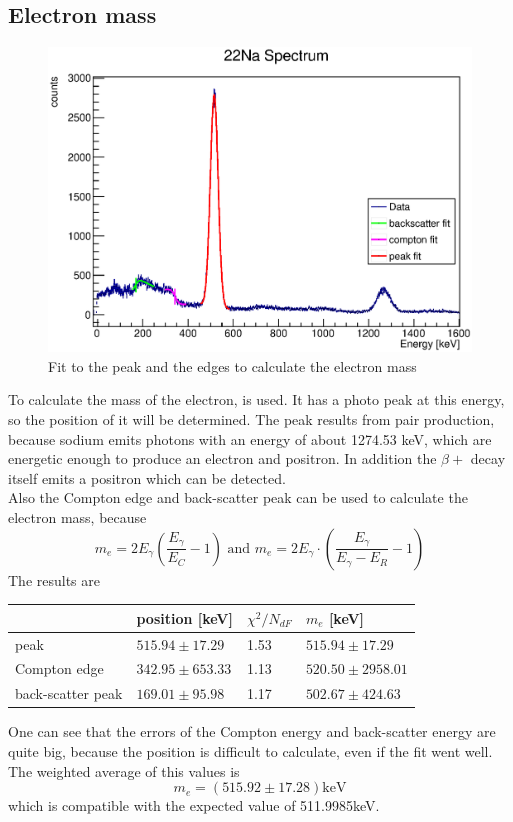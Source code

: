 \documentclass{article}
\begin{document}
\subsection{Electron mass}
\begin{figure}[H]
    \centering
    \includegraphics[width=\textwidth]{Graphen/e_mass/e_mass_imp.eps}
    \caption{Fit to the peak and the edges to calculate the electron mass}
    \label{e_mass}
\end{figure}
To calculate the mass of the electron,  is used. It has a photo peak at this energy, so the position of it will be determined. The peak results from pair production, because sodium emits photons with an energy of about 1274.53 keV, which are energetic enough to produce an electron and positron.
In addition the $\beta+$ decay itself emits a positron which can be detected.\\
Also the Compton edge and back-scatter peak can be used to calculate the electron mass, because
\begin{equation*}
    m_e = 2E_\gamma (\frac{E_\gamma}{E_C}-1) \mbox{ and } m_e = 2E_\gamma\cdot (\frac{E_\gamma}{E_\gamma-E_R}-1)
\end{equation*}
The results are
\begin{table}[H]
    \centering
    \begin{tabular}{l|l|l|l}
         & position [keV] & $\chi^2/N_{dF}$ & $m_e$ [keV] \\\hline
        peak & $515.94 \pm 17.29$ & 1.53 & $515.94 \pm 17.29$ \\\hline
        Compton edge & $342.95 \pm 653.33$ & 1.13 & $520.50\pm 2958.01$\\\hline
        back-scatter peak &  $169.01 \pm 95.98$ & 1.17 & $502.67 \pm 424.63$
    \end{tabular}
\end{table}
One can see that the errors of the Compton energy and back-scatter energy are quite big, because the position is difficult to calculate, even if the fit went well. The weighted average of this values is
\begin{equation*}
    m_e = (515.92 \pm 17.28)\mbox{keV}
\end{equation*}
which is compatible with the expected value of 511.9985\footnotemark keV. 
\end{document}
